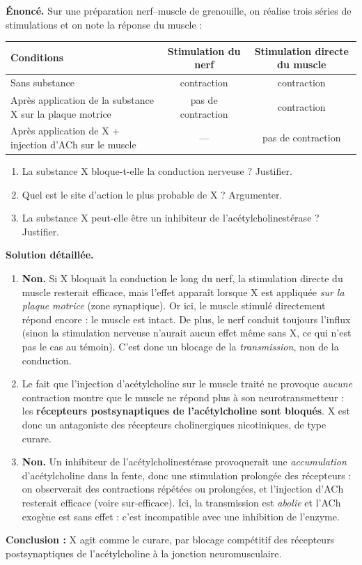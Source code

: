 \documentclass[11pt]{article}
\begin{document}
\begin{exoresolu}
\textbf{Énoncé.} Sur une préparation nerf--muscle de grenouille, on réalise trois séries de stimulations et on note la réponse du muscle :

\begin{center}
\begin{tabular}{|l|c|c|}
\hline
\rowcolor{popblueL} \textbf{Conditions} & \textbf{Stimulation du nerf} & \textbf{Stimulation directe du muscle} \\
\hline
Sans substance & contraction & contraction \\
\hline
Après application de la substance X sur la plaque motrice & pas de contraction & contraction \\
\hline
Après application de X + injection d'ACh sur le muscle & --- & pas de contraction \\
\hline
\end{tabular}
\end{center}

\begin{enumerate}
\item La substance X bloque-t-elle la conduction nerveuse ? Justifier.
\item Quel est le site d'action le plus probable de X ? Argumenter.
\item La substance X peut-elle être un inhibiteur de l'acétylcholinestérase ? Justifier.
\end{enumerate}

\tcblower
\textbf{Solution détaillée.}
\begin{enumerate}
\item \textbf{Non.} Si X bloquait la conduction le long du nerf, la stimulation directe du muscle resterait efficace, mais l'effet apparaît lorsque X est appliquée \emph{sur la plaque motrice} (zone synaptique). Or ici, le muscle stimulé directement répond encore : le muscle est intact. De plus, le nerf conduit toujours l'influx (sinon la stimulation nerveuse n'aurait aucun effet même sans X, ce qui n'est pas le cas au témoin). C'est donc un blocage de la \emph{transmission}, non de la conduction.
\item Le fait que l'injection d'acétylcholine sur le muscle traité ne provoque \emph{aucune} contraction montre que le muscle ne répond plus à son neurotransmetteur : les \textbf{récepteurs postsynaptiques de l'acétylcholine sont bloqués}. X est donc un antagoniste des récepteurs cholinergiques nicotiniques, de type curare.
\item \textbf{Non.} Un inhibiteur de l'acétylcholinestérase provoquerait une \emph{accumulation} d'acétylcholine dans la fente, donc une stimulation prolongée des récepteurs : on observerait des contractions répétées ou prolongées, et l'injection d'ACh resterait efficace (voire sur-efficace). Ici, la transmission est \emph{abolie} et l'ACh exogène est sans effet : c'est incompatible avec une inhibition de l'enzyme.
\end{enumerate}
\textbf{Conclusion :} X agit comme le curare, par blocage compétitif des récepteurs postsynaptiques de l'acétylcholine à la jonction neuromusculaire.
\end{exoresolu}
\end{document}

